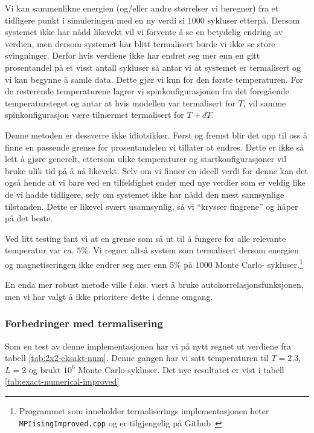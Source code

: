 \documentclass[11pt]{article}
\begin{document}
Vi kan sammenlikne energien (og/eller andre størrelser vi beregner)
fra et tidligere punkt i simuleringen med en ny verdi si 1000 sykluser
etterpå. Dersom systemet ikke har nådd likevekt vil vi forvente å se
en betydelig endring av verdien, men dersom systemet har blitt
termalisert burde vi ikke se store svingninger. Derfor hvis verdiene ikke har endret
seg mer enn en gitt prosentandel på et visst antall sykluser så antar vi at
systemet er termalisert og vi kan begynne å samle data. Dette gjør vi
kun for den første temperaturen. For de resterende temperaturene lagrer
vi spinkonfigurasjonen fra det foregående temperatursteget og antar at hvis
modellen var termalisert for $T$, vil samme spinkonfigurasjon være tilnærmet
termalisert for $T+dT$.

Denne metoden er dessverre ikke idiotsikker. Først og fremst blir
det opp til oss å finne en passende grense for prosentandelen vi
tillater at endres. Dette er ikke så lett å gjøre generelt, ettersom
ulike temperaturer og startkonfigurasjoner vil bruke ulik tid på å nå
likevekt. Selv om vi finner en ideell verdi for denne kan det også hende
at vi bare ved en tilfeldighet ender med nye verdier som er veldig
like de vi hadde tidligere, selv om systemet ikke har nådd den mest
sannsynlige tilstanden. Dette er likevel svært usannsynlig, så vi
``krysser fingrene'' og håper på det beste.

Ved litt testing fant vi at en grense som så ut til å fungere for alle relevante
temperatur var ca. $5\%$. Vi regner altså system som termalisert
dersom energien og magnetiseringen ikke endrer seg mer enn $5\%$ på $1000$ Monte Carlo-
sykluser.\footnote{Programmet som inneholder termaliserings
implementasjonen heter \texttt{MPIisingImproved.cpp} og er
tilgjengelig på Github~\cite{github-repo}}

En enda mer robust metode ville f.eks. vært å bruke autokorrelasjonsfunksjonen,
men vi har valgt å ikke prioritere dette i denne omgang.

\subsubsection{Forbedringer med termalisering}
Som en test av denne implementasjonen har vi på nytt regnet ut
verdiene fra tabell \ref{tab:2x2-eksakt-num}. Denne gangen har vi satt
temperaturen til $T=2.3$, $L=2$ og brukt $10^6$ Monte
Carlo-sykluser. Det nye resultatet er vist i tabell \ref{tab:exact-numerical-improved}
\end{document}
